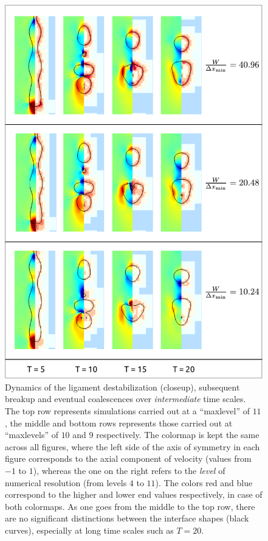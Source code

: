 \begin{figure}
\centering
\includegraphics{plots/ligament_breakup/resolution_compare.pdf}
	\caption{Dynamics of the ligament destabilization (closeup), subsequent breakup 
	and eventual coalescences over \textit{intermediate} time scales.
	The top row represents simulations carried out at a ``maxlevel'' of $11$,
	the middle and bottom rows represents those carried out at ``maxlevels'' of
	$10$ and $9$ respectively. 
	The colormap is kept the same across all figures, where the left 
	side of the axis of symmetry in each figure corresponds to the axial component of 
	velocity (values from $-1$ to $1$), whereas the one on the right refers to 
	the \textit{level} of numerical resolution (from levels $4$ to $11$). 
	The colors red and blue correspond to the higher and lower 
	end values respectively, in case of both colormaps. 
	As one goes from the middle to the top row, there are no significant distinctions 
	between the interface shapes (black curves), especially at long time scales such as $T=20$. 
	}
\label{res_comp}
\end{figure}

